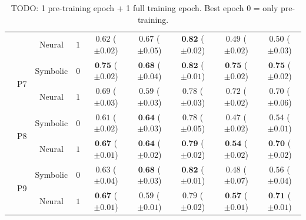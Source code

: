 \begin{table}[!t]
\begin{tabular}{ccccccccc}
		&  & Neural & $1$ & $0.62 $ {\tiny ($\pm 0.02$)} & $0.67 $ {\tiny ($\pm 0.05$)} & $\textbf{0.82} $ {\tiny ($\pm 0.02$)} & $0.49 $ {\tiny ($\pm 0.02$)} & $0.50 $ {\tiny ($\pm 0.03$)}\\
		\cmidrule{2-9}
		& \multirow{2}{*}{P7} & Symbolic & $0$ & $\textbf{0.75} $ {\tiny ($\pm 0.02$)} & $\textbf{0.68} $ {\tiny ($\pm 0.04$)} & $\textbf{0.82} $ {\tiny ($\pm 0.01$)} & $\textbf{0.75} $ {\tiny ($\pm 0.02$)} & $\textbf{0.75} $ {\tiny ($\pm 0.02$)}\\
		&  & Neural & $1$ & $0.69 $ {\tiny ($\pm 0.03$)} & $0.59 $ {\tiny ($\pm 0.03$)} & $0.78 $ {\tiny ($\pm 0.03$)} & $0.72 $ {\tiny ($\pm 0.02$)} & $0.70 $ {\tiny ($\pm 0.06$)}\\
		\cmidrule{2-9}
		& \multirow{2}{*}{P8} & Symbolic & $0$ & $0.61 $ {\tiny ($\pm 0.02$)} & $\textbf{0.64} $ {\tiny ($\pm 0.03$)} & $0.78 $ {\tiny ($\pm 0.05$)} & $0.47 $ {\tiny ($\pm 0.02$)} & $0.54 $ {\tiny ($\pm 0.01$)}\\
		&  & Neural & $1$ & $\textbf{0.67} $ {\tiny ($\pm 0.01$)} & $\textbf{0.64} $ {\tiny ($\pm 0.02$)} & $\textbf{0.79} $ {\tiny ($\pm 0.02$)} & $\textbf{0.54} $ {\tiny ($\pm 0.02$)} & $\textbf{0.70} $ {\tiny ($\pm 0.02$)}\\
		\cmidrule{2-9}
		& \multirow{2}{*}{P9} & Symbolic & $0$ & $0.63 $ {\tiny ($\pm 0.04$)} & $\textbf{0.68} $ {\tiny ($\pm 0.03$)} & $\textbf{0.82} $ {\tiny ($\pm 0.01$)} & $0.48 $ {\tiny ($\pm 0.07$)} & $0.56 $ {\tiny ($\pm 0.04$)}\\
		&  & Neural & $1$ & $\textbf{0.67} $ {\tiny ($\pm 0.01$)} & $0.59 $ {\tiny ($\pm 0.01$)} & $0.79 $ {\tiny ($\pm 0.02$)} & $\textbf{0.57} $ {\tiny ($\pm 0.01$)} & $\textbf{0.71} $ {\tiny ($\pm 0.01$)}\\
		
		\bottomrule
	\end{tabular}
\caption{TODO: 1 pre-training epoch + 1 full training epoch. Best epoch 0 = only pre-training.}
\end{table}

